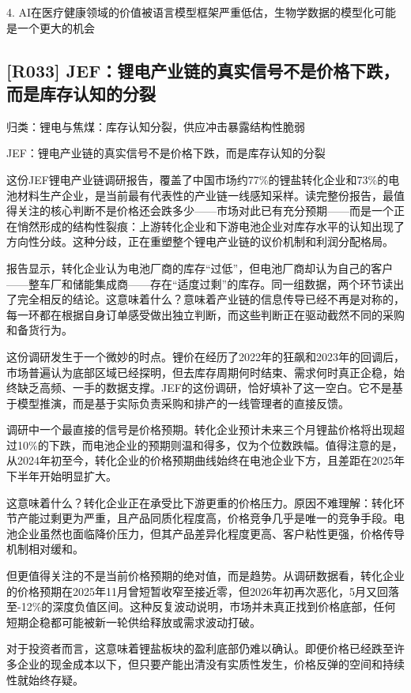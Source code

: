 \documentclass[11pt]{ctexart}
\begin{document}
4. AI在医疗健康领域的价值被语言模型框架严重低估，生物学数据的模型化可能是一个更大的机会

\subsection{[R033] JEF：锂电产业链的真实信号不是价格下跌，而是库存认知的分裂}
{\small\color{refgray}归类：锂电与焦煤：库存认知分裂，供应冲击暴露结构性脆弱}

JEF：锂电产业链的真实信号不是价格下跌，而是库存认知的分裂

这份JEF锂电产业链调研报告，覆盖了中国市场约77\%的锂盐转化企业和73\%的电池材料生产企业，是当前最有代表性的产业链一线感知采样。读完整份报告，最值得关注的核心判断不是价格还会跌多少——市场对此已有充分预期——而是一个正在悄然形成的结构性裂痕：上游转化企业和下游电池企业对库存水平的认知出现了方向性分歧。这种分歧，正在重塑整个锂电产业链的议价机制和利润分配格局。

报告显示，转化企业认为电池厂商的库存“过低”，但电池厂商却认为自己的客户——整车厂和储能集成商——存在“适度过剩”的库存。同一组数据，两个环节读出了完全相反的结论。这意味着什么？意味着产业链的信息传导已经不再是对称的，每一环都在根据自身订单感受做出独立判断，而这些判断正在驱动截然不同的采购和备货行为。

这份调研发生于一个微妙的时点。锂价在经历了2022年的狂飙和2023年的回调后，市场普遍认为底部区域已经探明，但去库存周期何时结束、需求何时真正企稳，始终缺乏高频、一手的数据支撑。JEF的这份调研，恰好填补了这一空白。它不是基于模型推演，而是基于实际负责采购和排产的一线管理者的直接反馈。

调研中一个最直接的信号是价格预期。转化企业预计未来三个月锂盐价格将出现超过10\%的下跌，而电池企业的预期则温和得多，仅为个位数跌幅。值得注意的是，从2024年初至今，转化企业的价格预期曲线始终在电池企业下方，且差距在2025年下半年开始明显扩大。

这意味着什么？转化企业正在承受比下游更重的价格压力。原因不难理解：转化环节产能过剩更为严重，且产品同质化程度高，价格竞争几乎是唯一的竞争手段。电池企业虽然也面临降价压力，但其产品差异化程度更高、客户粘性更强，价格传导机制相对缓和。

但更值得关注的不是当前价格预期的绝对值，而是趋势。从调研数据看，转化企业的价格预期在2025年11月曾短暂收窄至接近零，但2026年初再次恶化，5月又回落至-12\%的深度负值区间。这种反复波动说明，市场并未真正找到价格底部，任何短期企稳都可能被新一轮供给释放或需求波动打破。

对于投资者而言，这意味着锂盐板块的盈利底部仍难以确认。即便价格已经跌至许多企业的现金成本以下，但只要产能出清没有实质性发生，价格反弹的空间和持续性就始终存疑。
\end{document}
